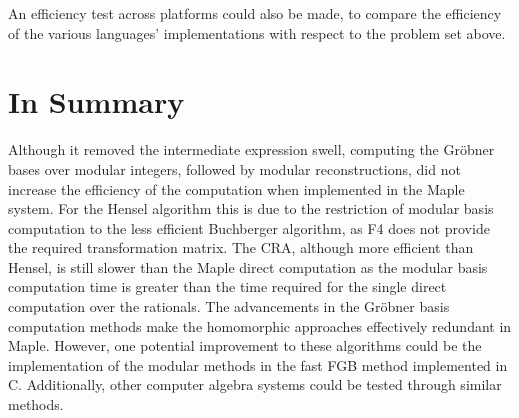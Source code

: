 \documentclass[letterpaper,12pt,titlepage,oneside,final]{book}
\begin{document}
An efficiency test across platforms could also be made, to compare the efficiency of the various languages' implementations with respect to the problem set above.


\section{In Summary}

Although it removed the intermediate expression swell, computing the Gr\"obner bases over modular integers, followed by modular reconstructions, did not increase the efficiency of the computation when implemented in the Maple system.  For the Hensel algorithm this is due to the restriction of modular basis computation to the less efficient Buchberger algorithm, as F4 does not provide the required transformation matrix.  The CRA, although more efficient than Hensel, is still slower than the Maple direct computation as the modular basis computation time is greater than the time required for the single direct computation over the rationals.  The advancements in the Gr\"obner basis computation methods make the homomorphic approaches effectively redundant in Maple.  However, one potential improvement to these algorithms could be the implementation of the modular methods in the fast FGB method implemented in C.  Additionally, other computer algebra systems could be tested through similar methods. 
\end{document}
